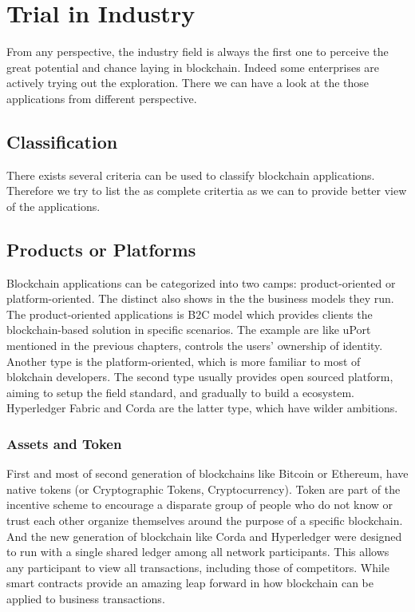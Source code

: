 \section{Trial in Industry}
From any perspective, the industry field is always the first one to perceive the great potential and chance laying in blockchain.
Indeed some enterprises are actively trying out the exploration. There we can have a look at the those applications from different perspective.

\subsection{Classification}
There exists several criteria can be used to classify blockchain applications. Therefore we try to list the as complete critertia as we can to provide better view of the applications.
\subsection{Products or Platforms}
Blockchain applications can be categorized into two camps: product-oriented or platform-oriented. The distinct also shows in the the business models they run. The product-oriented applications is B2C model which provides clients the blockchain-based solution in specific scenarios. The example are like uPort mentioned in the previous chapters, controls the users' ownership of identity. Another type is the
platform-oriented, which is more familiar to most of blokchain developers. The second type usually provides open sourced platform, aiming to setup the field standard, and gradually to build a ecosystem. Hyperledger Fabric and Corda are the latter type, which have wilder ambitions.

\subsubsection{Assets and Token}
First and most of second generation of blockchains like Bitcoin or Ethereum, have native tokens (or Cryptographic Tokens, Cryptocurrency). 
Token are part of the incentive scheme to encourage a disparate group of people who do not know or trust each other organize themselves around the purpose of a specific blockchain. And the new generation of blockchain like Corda and Hyperledger were designed to run with a single shared ledger among all network participants. This allows any participant to view all transactions, including those of competitors. While smart contracts provide an amazing leap forward in how blockchain can be applied to business transactions. 
